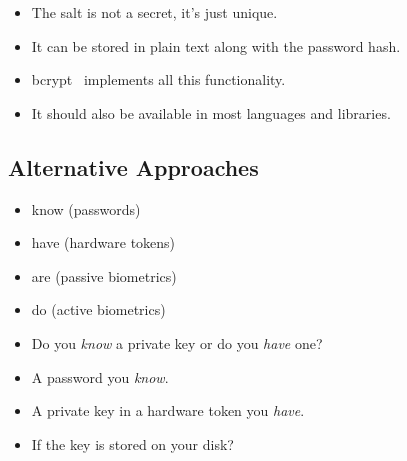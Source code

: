 \begin{frame}
  \begin{remark}
    \begin{itemize}
      \item The salt is not a secret, it's just unique.
      \item It can be stored in plain text along with the password hash.
    \end{itemize}
  \end{remark}
\end{frame}

\begin{frame}
  \begin{example}
    \begin{itemize}
      \item bcrypt~\cite{bcrypt} implements all this functionality.
      \item It should also be available in most languages and libraries.
    \end{itemize}
  \end{example}
\end{frame}

\subsection{Alternative Approaches}

\begin{frame}
  \begin{example}
    \begin{itemize}
      \item know (passwords)
      \item have (hardware tokens)
      \item are (passive biometrics)
      \item do (active biometrics)
    \end{itemize}
  \end{example}

  \pause{}

  \begin{remark}
    \begin{itemize}
      \item Do you \emph{know} a private key or do you \emph{have} one?
      \item A password you \emph{know}.
      \item A private key in a hardware token you \emph{have}.
      \item If the key is stored on your disk?
    \end{itemize}
  \end{remark}
\end{frame}


